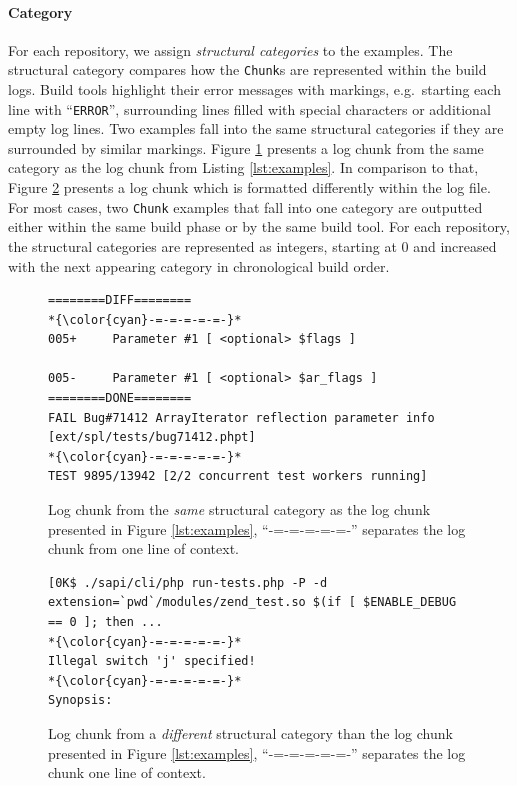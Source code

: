 \documentclass[\myrootdir/main.tex]{subfiles}
\begin{document}
\paragraph{Category}
For each repository, we assign \emph{structural categories} to the examples.
The structural category compares how the \texttt{Chunk}s are represented within the build logs.
Build tools highlight their error messages with markings, e.g.\ starting each line with ``\texttt{ERROR}'', surrounding lines filled with special characters or additional empty log lines.
Two examples fall into the same structural categories if they are surrounded by similar markings.
Figure \ref{lst:same-category} presents a log chunk from the same category as the log chunk from Listing \ref{lst:examples}.
In comparison to that, Figure \ref{lst:different-category} presents a log chunk which is formatted differently within the log file.
For most cases, two \texttt{Chunk} examples that fall into one category are outputted either within the same build phase or by the same build tool.
For each repository, the structural categories are represented as integers, starting at 0 and increased with the next appearing category in chronological build order.

\begin{figure}[]
	\centering
\begin{lstlisting}[breaklines=true]
========DIFF========
*{\color{cyan}-=-=-=-=-=-}*
005+     Parameter #1 [ <optional> $flags ]

005-     Parameter #1 [ <optional> $ar_flags ]
========DONE========
FAIL Bug#71412 ArrayIterator reflection parameter info [ext/spl/tests/bug71412.phpt] 
*{\color{cyan}-=-=-=-=-=-}*
TEST 9895/13942 [2/2 concurrent test workers running]
\end{lstlisting}
	\caption[Log chunk from the \emph{same} structural category as the log chunk presented in Figure \ref{lst:examples}.]{Log chunk from the \emph{same} structural category as the log chunk presented in Figure \ref{lst:examples}, ``{\color{cyan}-=-=-=-=-=-}'' separates the log chunk from one line of context.}
	\label{lst:same-category}
\end{figure}

\begin{figure}[]
	\centering
\begin{lstlisting}[breaklines=true]
[0K$ ./sapi/cli/php run-tests.php -P -d extension=`pwd`/modules/zend_test.so $(if [ $ENABLE_DEBUG == 0 ]; then ...
*{\color{cyan}-=-=-=-=-=-}*
Illegal switch 'j' specified!
*{\color{cyan}-=-=-=-=-=-}*
Synopsis:
\end{lstlisting}
	\caption[Log chunk from a \emph{different} structural category than the log chunk presented in Figure \ref{lst:examples}.]{Log chunk from a \emph{different} structural category than the log chunk presented in Figure \ref{lst:examples}, ``{\color{cyan}-=-=-=-=-=-}'' separates the log chunk one line of context.}
	\label{lst:different-category}
\end{figure}
\end{document}
